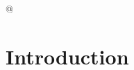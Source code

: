 \documentclass[
12pt, %
english, %
doublespacing, %
nolistspacing, %
liststotoc, %
headsepline, %
chapterinoneline, %
openany, %
]{DoctoralThesis}\usepackage[]{graphicx}\usepackage[]{color}
\begin{document}
%
%


%
%








\pagestyle{thesis} %







@


\chapter{Introduction} %
\end{document}
